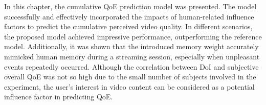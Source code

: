 In this chapter, the cumulative QoE prediction model was presented.
The model successfully and effectively incorporated the impacts of human-related influence factors to predict the cumulative perceived video quality.
In different scenarios, the proposed model achieved impressive performance, outperforming the reference model.
Additionally, it was shown that the introduced memory weight accurately mimicked human memory during a streaming session, especially when unpleasant events repeatedly occurred.
Although the correlation between DoI and subjective overall QoE was not so high due to the small number of subjects involved in the experiment, the user's interest in video content can be considered as a potential influence factor in predicting QoE.